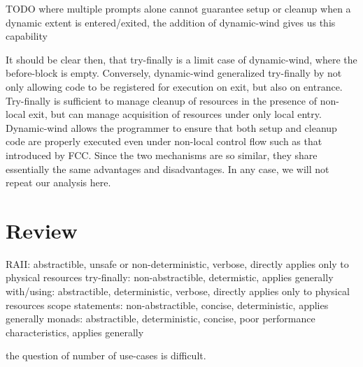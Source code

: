\documentclass[11pt]{article}
\begin{document}
TODO where multiple prompts alone cannot guarantee setup or cleanup when a dynamic extent is entered/exited, the addition of dynamic-wind gives us this capability

It should be clear then, that try-finally is a limit case of dynamic-wind, where the before-block is empty.
Conversely, dynamic-wind generalized try-finally by not only allowing code to be registered for execution on exit, but also on entrance.
Try-finally is sufficient to manage cleanup of resources in the presence of non-local exit, but can manage acquisition of resources under only local entry.
Dynamic-wind allows the programmer to ensure that both setup and cleanup code are properly executed even under non-local control flow such as that introduced by FCC.
Since the two mechanisms are so similar, they share essentially the same advantages and disadvantages.
In any case, we will not repeat our analysis here.




\section{Review}
\label{sec:review}





RAII: abstractible, unsafe or non-deterministic, verbose, directly applies only to physical resources
try-finally: non-abstractible, determistic, applies generally
with/using: abstractible, deterministic, verbose, directly applies only to physical resources
scope statements: non-abstractible, concise, deterministic, applies generally
monads: abstractible, deterministic, concise, poor performance characteristics, applies generally

the question of number of use-cases is difficult.
\end{document}
